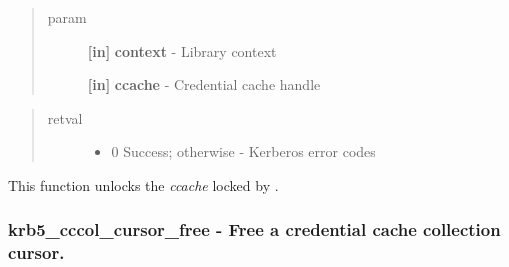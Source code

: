 \documentclass[letterpaper,10pt,english]{sphinxmanual}
\begin{document}
\begin{quote}\begin{description}
\item[{param}] \leavevmode
\textbf{{[}in{]}} \textbf{context} - Library context

\textbf{{[}in{]}} \textbf{ccache} - Credential cache handle

\end{description}\end{quote}
\begin{quote}\begin{description}
\item[{retval}] \leavevmode\begin{itemize}
\item {} 
0   Success; otherwise - Kerberos error codes

\end{itemize}

\end{description}\end{quote}

This function unlocks the \emph{ccache} locked by {\hyperref[appdev/refs/api/krb5_cc_lock:c.krb5_cc_lock]{}} .


\subsubsection{krb5\_cccol\_cursor\_free -  Free a credential cache collection cursor.}
\label{appdev/refs/api/krb5_cccol_cursor_free::doc}\label{appdev/refs/api/krb5_cccol_cursor_free:krb5-cccol-cursor-free-free-a-credential-cache-collection-cursor}

\begin{fulllineitems}
\label{appdev/refs/api/krb5_cccol_cursor_free:c.krb5_cccol_cursor_free}
\end{fulllineitems}
\end{document}
